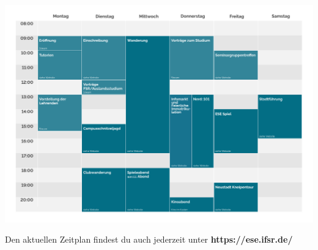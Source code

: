 %
\thispagestyle{empty}
  \begin{landscape}

\includegraphics[scale=0.8]{timetable/zeitplan.pdf}%
  \enlargethispage{3em}
%
%
\begin{center}
  Den aktuellen Zeitplan findest du auch jederzeit unter
  \textbf{https://ese.ifsr.de/}~
\end{center}
  \end{landscape}
